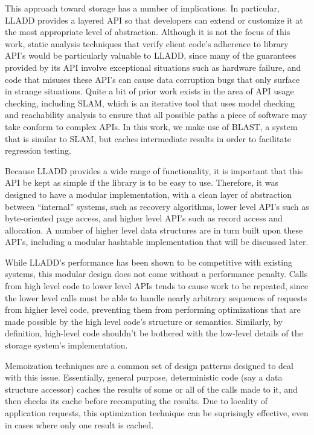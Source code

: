 \documentclass[10pt,letterpaper,twocolumn,english]{article}
\newcommand{\yad}{LLADD\xspace}
\begin{document}
This approach toward storage has a number of implications.  In
particular, \yad provides a layered API so that developers can extend
or customize it at the most appropriate level of abstraction.
Although it is not the focus of this work, static analysis techniques
that verify client code's adherence to library API's would be
particularly valuable to \yad, since many of the guarantees provided
by its API involve exceptional situations such as hardware failure,
and code that misuses these API's can cause data corruption bugs that
only surface in strange situations.  Quite a bit of prior work exists
in the area of API usage checking, including SLAM, which is an
iterative tool that uses model checking and reachability analysis to
ensure that all possible paths a piece of software may take conform to
complex APIs.  In this work, we make use of BLAST, a system that is
similar to SLAM, but caches intermediate results in order to
facilitate regression testing.

Because \yad provides a wide range of functionality, it is important
that this API be kept as simple if the library is to be easy to use.
Therefore, it was designed to have a modular implementation, with a
clean layer of abstraction between ``internal'' systems, such as
recovery algorithms, lower level API's such as byte-oriented page
access, and higher level API's such as record access and allocation.
A number of higher level data structures are in turn built upon these
API's, including a modular hashtable implementation that will be
discussed later.
 
While \yad's performance has been shown to be competitive with
existing systems, this modular design does not come without a
performance penalty.  Calls from high level code to lower level APIs
tends to cause work to be repeated, since the lower level calls must
be able to handle nearly arbitrary sequences of requests from higher
level code, preventing them from performing optimizations that are
made possible by the high level code's structure or semantics.
Similarly, by definition, high-level code shouldn't be bothered with
the low-level details of the storage system's implementation.  

Memoization techniques are a common set of design patterns designed to
deal with this issue.  Essentially, general purpose, deterministic
code (say a data structure accessor) caches the results of some or all
of the calls made to it, and then checks its cache before recomputing
the results.  Due to locality of application requests, this
optimization technique can be suprisingly effective, even in cases
where only one result is cached.
\end{document}
